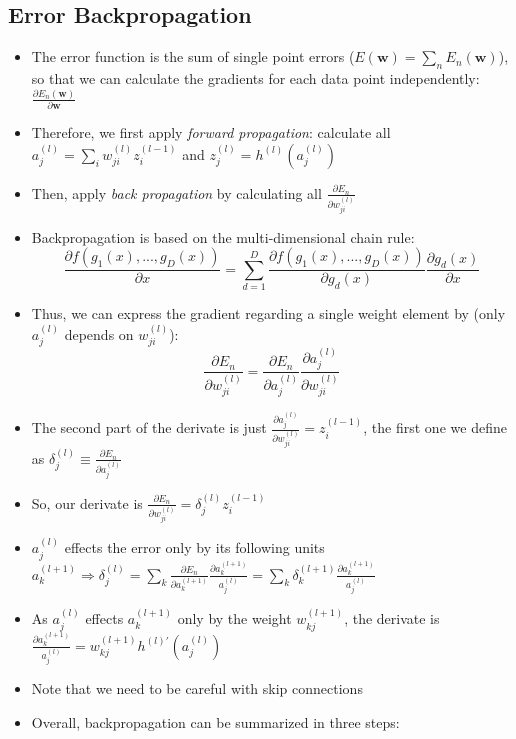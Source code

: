 \subsection{Error Backpropagation}
\begin{itemize}
	\item The error function is the sum of single point errors ($E(\bm{w})=\sum_{n}E_n(\bm{w})$), so that we can calculate the gradients for each data point independently: $\frac{\partial E_n(\bm{w})}{\partial \bm{w}}$ 
	\item Therefore, we first apply \textit{forward propagation}: calculate all $a_j^{(l)} = \sum_i w_{ji}^{(l)}z_i^{(l-1)}$ and $z_j^{(l)}=h^{(l)}\left(a_j^{(l)}\right)$
	\item Then, apply \textit{back propagation} by calculating all $\frac{\partial E_n}{\partial w_{ji}^{(l)}}$
	\item Backpropagation is based on the multi-dimensional chain rule: 
	$$\frac{\partial f\left(g_1\left(x\right), ..., g_D\left(x\right) \right)}{\partial x} = \sum\limits_{d=1}^{D}\frac{\partial f\left(g_1\left(x\right), ..., g_D\left(x\right)\right)}{\partial g_d(x)}\frac{\partial g_d(x)}{\partial x}$$
	\item Thus, we can express the gradient regarding a single weight element by (only $a_{j}^{(l)}$ depends on $w_{ji}^{(l)}$):
	$$\frac{\partial E_n}{\partial w_{ji}^{(l)}}=\frac{\partial E_n}{\partial a_{j}^{(l)}}\frac{\partial a_{j}^{(l)}}{\partial w_{ji}^{(l)}}$$
	\item The second part of the derivate is just $\frac{\partial a_{j}^{(l)}}{\partial w_{ji}^{(l)}}=z_{i}^{(l-1)}$, the first one we define as $\delta_j^{(l)}\equiv \frac{\partial E_n}{\partial a_j^{(l)}}$
	\item So, our derivate is $\frac{\partial E_n}{\partial w_{ji}^{(l)}}=\delta_j^{(l)}z_{i}^{(l-1)}$
	\item $a_j^{(l)}$ effects the error only by its following units $a_k^{(l+1)}\Rightarrow \delta_j^{(l)}=\sum_{k}\frac{\partial E_n}{\partial a_k^{(l+1)}}\frac{\partial a_k^{(l+1)}}{a_j^{(l)}} = \sum_{k}\delta_{k}^{(l+1)}\frac{\partial a_k^{(l+1)}}{a_j^{(l)}}$
	\item As $a_j^{(l)}$ effects $a_k^{(l+1)}$ only by the weight $w_{kj}^{(l+1)}$, the derivate is $\frac{\partial a_k^{(l+1)}}{a_j^{(l)}}=w_{kj}^{(l+1)}h^{(l)'} \left(a_{j}^{(l)}\right)$
	\item Note that we need to be careful with skip connections
	\item Overall, backpropagation can be summarized in three steps:

\end{itemize}
